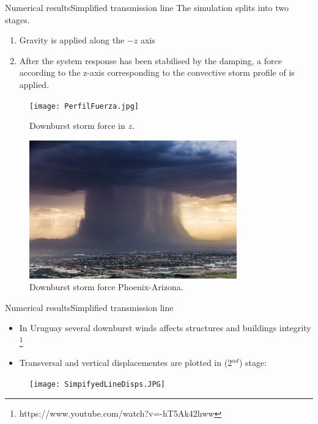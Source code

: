 \documentclass{beamer}
\begin{document}
\begin{frame}{Numerical results}{Simplified transmission line}
The simulation splits into two stages.
\begin{enumerate}
    \item Gravity is applied along the $-z$ axis
    \pause
    \item After the system response has been stabilised by the damping, a force according to the z-axis corresponding to the convective storm profile of \cite{Stengel2017a} is applied.
\end{enumerate}
\pause

\begin{figure}[!ht]
	\begin{minipage}[b]{0.45\linewidth}
		\centering
    \texttt{[image: PerfilFuerza.jpg]}
	\label{fig:DownburstForce}
      \caption{Downburst storm force in $z$.}
	\end{minipage}
	\hspace{0.3cm}
	\begin{minipage}[b]{0.45\linewidth}
		\centering
    \includegraphics[width=0.8\textwidth]{downburst.jpg}
      \caption{Downburst storm force Phoenix-Arizona.}
		\label{fig:Downburst-force}
	\end{minipage}
\end{figure}

\end{frame}
\begin{frame}{Numerical results}{Simplified transmission line}
\begin{itemize}
 \item In Uruguay several downburst winds  affects structures and buildings integrity \footnote{https://www.youtube.com/watch?v=-hT5Ak42hww}
 \item Transversal and vertical displacementes are plotted in (2$^{nd}$) stage:
\end{itemize}

\begin{figure}[H]
  \centering
    \texttt{[image: SimpifyedLineDisps.JPG]}
    \label{fig:LineDisps}
 \end{figure}

\end{frame}
\end{document}
